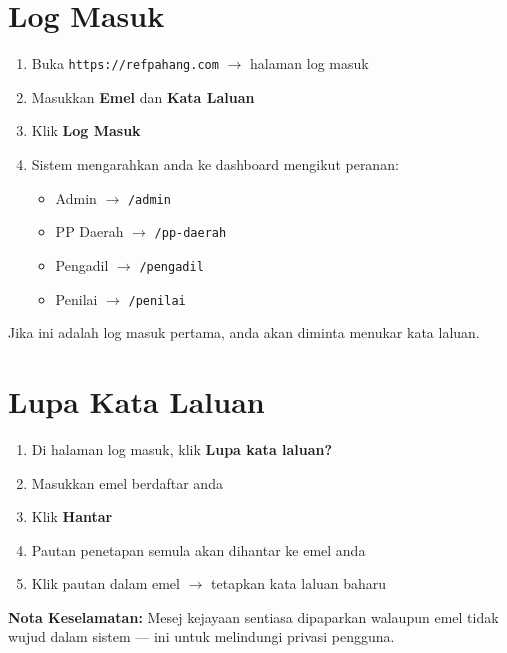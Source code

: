 \documentclass[12pt,a4paper]{report}
\newcommand{\btn}[1]{\colorbox{primaryblue!10}{\textcolor{primaryblue}{\textbf{#1}}}}
\begin{document}
\section{Log Masuk}

\begin{enumerate}[label=\textcolor{pbnpblue}{\textbf{Langkah \arabic*:}}, leftmargin=3.5em]
  \item Buka \texttt{https://refpahang.com} $\rightarrow$ halaman log masuk
  \item Masukkan \textbf{Emel} dan \textbf{Kata Laluan}
  \item Klik \btn{Log Masuk}
  \item Sistem mengarahkan anda ke dashboard mengikut peranan:
    \begin{itemize}
      \item Admin $\rightarrow$ \texttt{/admin}
      \item PP Daerah $\rightarrow$ \texttt{/pp-daerah}
      \item Pengadil $\rightarrow$ \texttt{/pengadil}
      \item Penilai $\rightarrow$ \texttt{/penilai}
    \end{itemize}
\end{enumerate}

\begin{infobox}
Jika ini adalah log masuk pertama, anda akan diminta menukar kata laluan.
\end{infobox}

\section{Lupa Kata Laluan}

\begin{enumerate}[label=\textcolor{pbnpblue}{\textbf{\arabic*.}}, leftmargin=2em]
  \item Di halaman log masuk, klik \btn{Lupa kata laluan?}
  \item Masukkan emel berdaftar anda
  \item Klik \btn{Hantar}
  \item Pautan penetapan semula akan dihantar ke emel anda
  \item Klik pautan dalam emel $\rightarrow$ tetapkan kata laluan baharu
\end{enumerate}

\begin{infobox}
\textbf{Nota Keselamatan:} Mesej kejayaan sentiasa dipaparkan walaupun emel tidak wujud dalam sistem --- ini untuk melindungi privasi pengguna.
\end{infobox}
\end{document}

